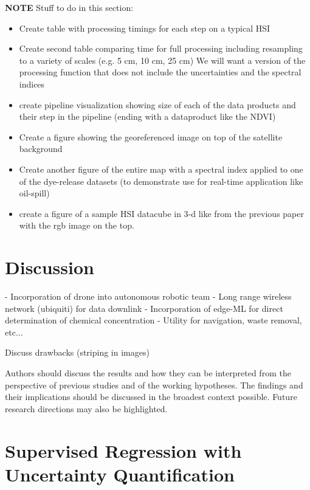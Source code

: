 \textbf{NOTE} Stuff to do in this section:
\begin{itemize}
    \item  Create table with processing timings for each step on a typical HSI
    \item Create second table comparing time for full processing including resampling to a variety of scales (e.g. 5 cm, 10 cm, 25 cm) We will want a version of the processing function that does not include the uncertainties and the spectral indices
    \item create pipeline visualization showing size of each of the data products and their step in the pipeline (ending with a dataproduct like the NDVI)
    \item Create a figure showing the georeferenced image on top of the satellite background 
    \item Create another figure of the entire map with a spectral index applied to one of the dye-release datasets (to demonstrate use for real-time application like oil-spill)
    \item create a figure of a sample HSI datacube in 3-d like from the previous paper with the rgb image on the top. 
\end{itemize}



\section{Discussion}

- Incorporation of drone into autonomous robotic team
- Long range wireless network (ubiquiti) for data downlink
- Incorporation of edge-ML for direct determination of chemical concentration
- Utility for navigation, waste removal, etc...

Discuss drawbacks (striping in images) 

Authors should discuss the results and how they can be interpreted from the perspective of previous studies and of the working hypotheses. The findings and their implications should be discussed in the broadest context possible. Future research directions may also be highlighted.




\section{Supervised Regression with Uncertainty Quantification}

